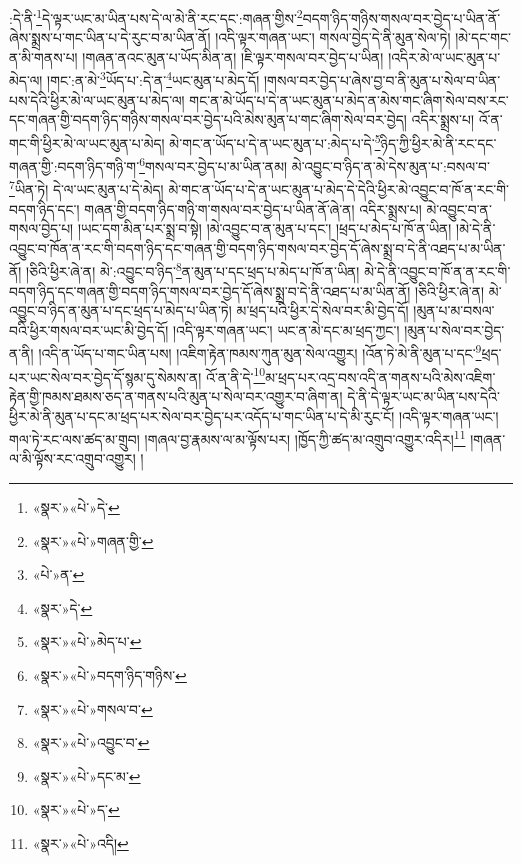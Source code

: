 :དེ་ནི་\footnote{«སྣར་»«པེ་»དེ་}དེ་ལྟར་ཡང་མ་ཡིན་པས་དེ་ལ་མེ་ནི་རང་དང་:གཞན་གྱིས་\footnote{«སྣར་»«པེ་»གཞན་གྱི་}བདག་ཉིད་གཉིས་གསལ་བར་བྱེད་པ་ཡིན་ནོ་ཞེས་སྨྲས་པ་གང་ཡིན་པ་དེ་རུང་བ་མ་ཡིན་ནོ། །འདི་ལྟར་གཞན་ཡང་། གསལ་བྱེད་དེ་ནི་མུན་སེལ་ཏེ། །མེ་དང་གང་ན་མི་གནས་པ། །གཞན་ནའང་མུན་པ་ཡོད་མིན་ན། །ཇི་ལྟར་གསལ་བར་བྱེད་པ་ཡིན། །འདིར་མེ་ལ་ཡང་མུན་པ་མེད་ལ། །གང་:ན་མེ་\footnote{«པེ་»ན་}ཡོད་པ་:དེ་ན་\footnote{«སྣར་»དེ་}ཡང་མུན་པ་མེད་དོ། །གསལ་བར་བྱེད་པ་ཞེས་བྱ་བ་ནི་མུན་པ་སེལ་བ་ཡིན་པས་དེའི་ཕྱིར་མེ་ལ་ཡང་མུན་པ་མེད་ལ། གང་ན་མེ་ཡོད་པ་དེ་ན་ཡང་མུན་པ་མེད་ན་མེས་གང་ཞིག་སེལ་བས་རང་དང་གཞན་གྱི་བདག་ཉིད་གཉིས་གསལ་བར་བྱེད་པའི་མེས་མུན་པ་གང་ཞིག་སེལ་བར་བྱེད། འདིར་སྨྲས་པ། འོ་ན་གང་གི་ཕྱིར་མེ་ལ་ཡང་མུན་པ་མེད། མེ་གང་ན་ཡོད་པ་དེ་ན་ཡང་མུན་པ་:མེད་པ་དེ་\footnote{«སྣར་»«པེ་»མེད་པ་}ཉིད་ཀྱི་ཕྱིར་མེ་ནི་རང་དང་གཞན་གྱི་:བདག་ཉིད་གཉི་ག་\footnote{«སྣར་»«པེ་»བདག་ཉིད་གཉིས་}གསལ་བར་བྱེད་པ་མ་ཡིན་ནམ། མེ་འབྱུང་བ་ཉིད་ན་མེ་དེས་མུན་པ་:བསལ་བ་\footnote{«སྣར་»«པེ་»གསལ་བ་}ཡིན་ཏེ། དེ་ལ་ཡང་མུན་པ་དེ་མེད། མེ་གང་ན་ཡོད་པ་དེ་ན་ཡང་མུན་པ་མེད་དེ་དེའི་ཕྱིར་མེ་འབྱུང་བ་ཁོ་ན་རང་གི་བདག་ཉིད་དང་། གཞན་གྱི་བདག་ཉིད་གཉི་ག་གསལ་བར་བྱེད་པ་ཡིན་ནོ་ཞེ་ན། འདིར་སྨྲས་པ། མེ་འབྱུང་བ་ན་གསལ་བྱེད་པ། །ཡང་དག་མིན་པར་སྨྲ་བ་སྟེ། །མེ་འབྱུང་བ་ན་མུན་པ་དང་། །ཕྲད་པ་མེད་པ་ཁོ་ན་ཡིན། །མེ་དེ་ནི་འབྱུང་བ་ཁོན་ན་རང་གི་བདག་ཉིད་དང་གཞན་གྱི་བདག་ཉིད་གསལ་བར་བྱེད་དོ་ཞེས་སྨྲ་བ་དེ་ནི་འཐད་པ་མ་ཡིན་ནོ། །ཅིའི་ཕྱིར་ཞེ་ན། མེ་:འབྱུང་བ་ཉིད་\footnote{«སྣར་»«པེ་»འབྱུང་བ་}ན་མུན་པ་དང་ཕྲད་པ་མེད་པ་ཁོ་ན་ཡིན། མེ་དེ་ནི་འབྱུང་བ་ཁོ་ན་ན་རང་གི་བདག་ཉིད་དང་གཞན་གྱི་བདག་ཉིད་གསལ་བར་བྱེད་དོ་ཞེས་སྨྲ་བ་དེ་ནི་འཐད་པ་མ་ཡིན་ནོ། །ཅིའི་ཕྱིར་ཞེ་ན། མེ་འབྱུང་བ་ཉིད་ན་མུན་པ་དང་ཕྲད་པ་མེད་པ་ཡིན་ཏེ། མ་ཕྲད་པའི་ཕྱིར་དེ་སེལ་བར་མི་བྱེད་དོ། །མུན་པ་མ་བསལ་བའི་ཕྱིར་གསལ་བར་ཡང་མི་བྱེད་དོ། །འདི་ལྟར་གཞན་ཡང་། ཡང་ན་མེ་དང་མ་ཕྲད་ཀྱང་། །མུན་པ་སེལ་བར་བྱེད་ན་ནི། །འདི་ན་ཡོད་པ་གང་ཡིན་པས། །འཇིག་རྟེན་ཁམས་ཀུན་མུན་སེལ་འགྱུར། །འོན་ཏེ་མེ་ནི་མུན་པ་དང་\footnote{«སྣར་»«པེ་»དང་མ་}ཕྲད་པར་ཡང་སེལ་བར་བྱེད་དོ་སྙམ་དུ་སེམས་ན། འོ་ན་ནི་དེ་\footnote{«སྣར་»«པེ་»ད་}མ་ཕྲད་པར་འདྲ་བས་འདི་ན་གནས་པའི་མེས་འཇིག་རྟེན་གྱི་ཁམས་ཐམས་ཅད་ན་གནས་པའི་མུན་པ་སེལ་བར་འགྱུར་བ་ཞིག་ན། དེ་ནི་དེ་ལྟར་ཡང་མ་ཡིན་པས་དེའི་ཕྱིར་མེ་ནི་མུན་པ་དང་མ་ཕྲད་པར་སེལ་བར་བྱེད་པར་འདོད་པ་གང་ཡིན་པ་དེ་མི་རུང་ངོ། །འདི་ལྟར་གཞན་ཡང་། གལ་ཏེ་རང་ལས་ཚད་མ་གྲུབ། །གཞལ་བྱ་རྣམས་ལ་མ་ལྟོས་པར། །ཁྱོད་ཀྱི་ཚད་མ་འགྲུབ་འགྱུར་འདིར།\footnote{«སྣར་»«པེ་»འདི།} །གཞན་ལ་མི་ལྟོས་རང་འགྲུབ་འགྱུར། །
